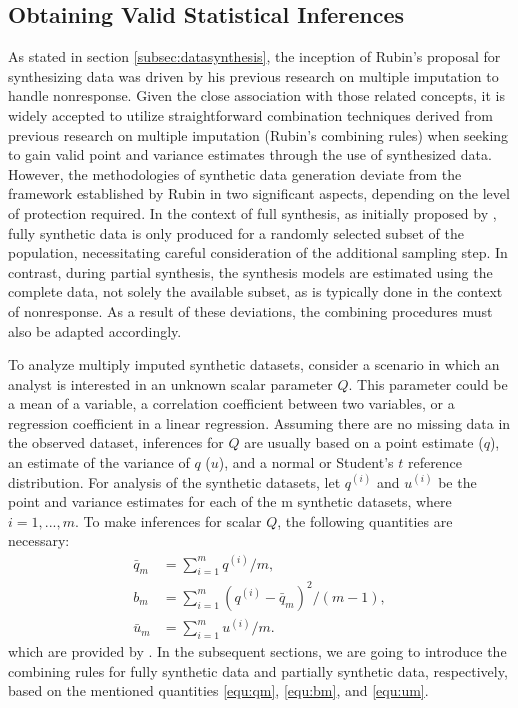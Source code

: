 \subsection{Obtaining Valid Statistical Inferences}
\label{subsec:inference}
As stated in section \ref{subsec:datasynthesis}, the inception of Rubin's proposal for synthesizing data was driven by his previous research on multiple imputation to handle nonresponse. Given the close association with those related concepts, it is widely accepted to utilize straightforward combination techniques derived from previous research on multiple imputation (Rubin's combining rules) when seeking to gain valid point and variance estimates through the use of synthesized data. However, the methodologies of synthetic data generation deviate from the framework established by Rubin in two significant aspects, depending on the level of protection required. In the context of full synthesis, as initially proposed by \citet{rubin1993statistical}, fully synthetic data is only produced for a randomly selected subset of the population, necessitating careful consideration of the additional sampling step. In contrast, during partial synthesis, the synthesis models are estimated using the complete data, not solely the available subset, as is typically done in the context of nonresponse. As a result of these deviations, the combining procedures must also be adapted accordingly.

To analyze multiply imputed synthetic datasets, consider a scenario in which an analyst is interested in an unknown scalar parameter $Q$. This parameter could be a mean of a variable, a correlation coefficient between two variables, or a regression coefficient in a linear regression. Assuming there are no missing data in the observed dataset, inferences for $Q$ are usually based on a point estimate ($q$), an estimate of the variance of $q$ ($u$), and a normal or Student's $t$ reference distribution. For analysis of the synthetic datasets, let $q^{(i)}$ and $u^{(i)}$ be the point and variance estimates for each of the m synthetic datasets, where $i = 1, ..., m$. To make inferences for scalar $Q$, the following quantities are necessary:
\begin{align}
\label{equ:qm}
\bar{q}_{m} &= \sum_{i=1}^{m}q^{(i)}/m,\\
\label{equ:bm}
b_m &= \sum_{i=1}^{m}(q^{(i)}-\bar{q}_{m})^2/(m-1),\\
\label{equ:um}
\bar{u}_{m} &= \sum_{i=1}^{m}u^{(i)}/m.
\end{align}
which are provided by \citet{drechsler2011synthetic}. In the subsequent sections, we are going to introduce the combining rules for fully synthetic data and partially synthetic data, respectively, based on the mentioned quantities \eqref{equ:qm}, \eqref{equ:bm}, and \eqref{equ:um}.

